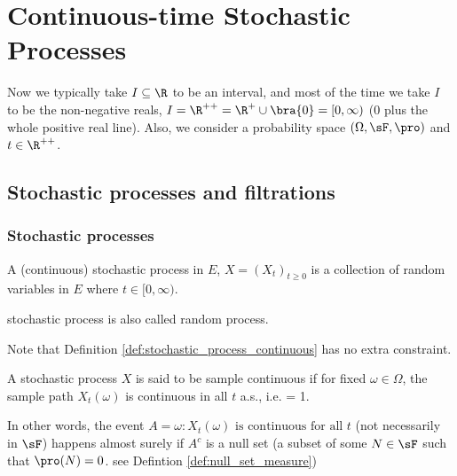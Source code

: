 \chapter{Continuous-time Stochastic Processes}

Now we typically take $I \subseteq \R$ to be an interval, and most of the time we take $I$ to be the non-negative reals, $I = \R^{++} = \R^+ \cup \bra{0} = [0,\infty)$ (0 plus the whole positive real line). Also, we
consider a probability space $(\Omega,\sF,\pro)$ and $t\in \R^{++}$.



\section{Stochastic processes and filtrations}

\subsection{Stochastic processes}

\begin{definition}\label{def:stochastic_process_continuous}
A (continuous) stochastic process in $E$, $X = (X_t)_{t\geq 0}$ is a collection of random variables in $E$ where $t\in [0,\infty)$.
\end{definition}

\begin{remark}
stochastic process is also called random process.
\end{remark}

Note that Definition \ref{def:stochastic_process_continuous} has no extra constraint.

\begin{definition}\label{def:sample_continuous_process}
A stochastic process $X$ is said to be sample continuous if for fixed $\omega \in \Omega$, the sample path $X_t(\omega)$ is continuous in all $t$ a.s., i.e.
\be
\pro{} = 1.
\ee

In other words, the event $A = {\omega:X_t(\omega)\text{ is continuous for all }t}$ (not necessarily in $\sF$) happens almost surely if $A^c$ is a null set (a subset of some $N\in \sF$ such that $\pro(N)=0$. see Defintion \ref{def:null_set_measure})
\end{definition}

